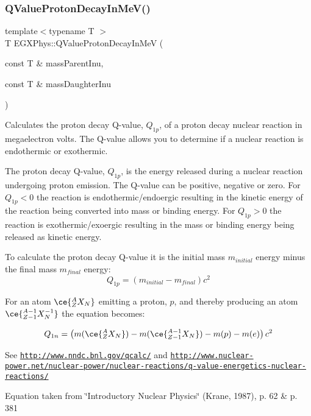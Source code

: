 \subsubsection{\texorpdfstring{Q\+Value\+Proton\+Decay\+In\+Me\+V()}{QValueProtonDecayInMeV()}}
{\footnotesize\ttfamily template$<$typename T $>$ \\
T E\+G\+X\+Phys\+::\+Q\+Value\+Proton\+Decay\+In\+MeV (\begin{DoxyParamCaption}\item[{const T \&}]{mass\+Parent\+Inu,  }\item[{const T \&}]{mass\+Daughter\+Inu }\end{DoxyParamCaption})}



Calculates the proton decay Q-\/value, $Q_{1p}$, of a proton decay nuclear reaction in megaelectron volts. The Q-\/value allows you to determine if a nuclear reaction is endothermic or exothermic. 

The proton decay Q-\/value, $Q_{1p}$, is the energy released during a nuclear reaction undergoing proton emission. The Q-\/value can be positive, negative or zero. For $Q_{1p} < 0$ the reaction is endothermic/endoergic resulting in the kinetic energy of the reaction being converted into mass or binding energy. For $Q_{1p} > 0$ the reaction is exothermic/exoergic resulting in the mass or binding energy being released as kinetic energy.

To calculate the proton decay Q-\/value it is the initial mass $m_{initial}$ energy minus the final mass $m_{final}$ energy\+: \[Q_{1p} = \left ( m_{initial}-m_{final}\right ) c^2\]

For an atom $\ce{ ^{A}_{Z}X_{N} }$ emitting a proton, $p$, and thereby producing an atom $\ce{ ^{A-1}_{Z-1}X^{-1}_{N} }$ the equation becomes\+:

\[Q_{1n} = \left ( m(\ce{ ^{A}_{Z}X_{N} }) - m(\ce{ ^{A-1}_{Z-1}X_{N} }) - m(p) - m(e)\right ) c^2\]

See \href{http://www.nndc.bnl.gov/qcalc/}{\tt http\+://www.\+nndc.\+bnl.\+gov/qcalc/} and \href{http://www.nuclear-power.net/nuclear-power/nuclear-reactions/q-value-energetics-nuclear-reactions/}{\tt http\+://www.\+nuclear-\/power.\+net/nuclear-\/power/nuclear-\/reactions/q-\/value-\/energetics-\/nuclear-\/reactions/}

Equation taken from \char`\"{}\+Introductory Nuclear Physics\char`\"{} (Krane, 1987), p. 62 \& p. 381


